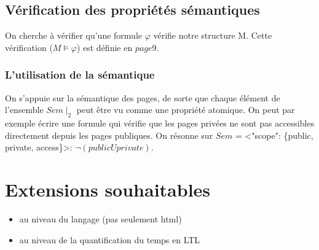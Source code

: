 \documentclass[a4paper]{report}
\begin{document}
\section*{Vérification des propriétés sémantiques}
On cherche à vérifier qu'une formule $ \varphi $ vérifie notre structure M. Cette vérification ($ M\models \varphi $) est définie en $page 9$.

\subsection*{ L'utilisation de la sémantique }
On s'appuie sur la sémantique des pages, de sorte que chaque élément de l'ensemble $Sem \mid_2$ peut être vu comme une propriété atomique. On peut par exemple écrire une formule qui vérifie que les pages privées ne sont pas accessibles directement depuis les pages publiques. On résonne sur $Sem$ = <"scope": \{public, private, access\}>: $\neg(public U private)$.\\


\chapter*{ Extensions souhaitables }
\begin{itemize}
\item au niveau du langage (pas seulement html)
\item au niveau de la quantification du temps en LTL
\end{itemize}
\end{document}
